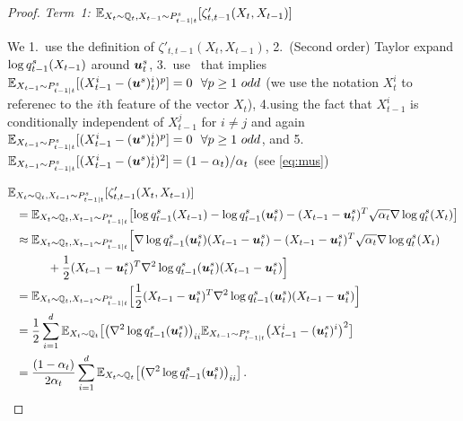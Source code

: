 \begin{proof}
\emph{Term~1:} $\allowbreak \textcolor{black}{\mathbb{E}}_{X_t\sim \mathbb{Q}_{t},X_{t-1}\sim P^s_{t-1|t}}[\zeta'_{t,t-1}(X_t,X_{t-1})]$

We  1.~use the definition of  $\zeta'_{t,t-1}(X_t,X_{t-1})$, 2.~(Second order) Taylor expand $\log q^s_{t-1}(X_{t-1})$ around $\boldsymbol{u}^s_t$, 3.~use~\citet[Lemma~7]{liang2024nonN} that implies $\textcolor{black}{\mathbb{E}}_{X_{t-1}\sim P^s_{t-1|t}}[(X_{t-1}^i-(\boldsymbol{u}^s)_t^i)^p]=0~~\forall p\ge 1~odd$ (we use the notation $X_{t}^i$ to referenec to the $i$th feature of the vector $X_{t}$), 4.using the fact that $X_{t-1}^i$ is conditionally independent of $X_{t-1}^j$ for $i\ne j$ and again $\textcolor{black}{\mathbb{E}}_{X_{t-1}\sim P^s_{t-1|t}}[(X_{t-1}^i-(\boldsymbol{u}^s)_t^i)^p]=0~~\forall p\ge 1~odd$, and 5.~$\textcolor{black}{\mathbb{E}}_{X_{t-1}\sim P^s_{t-1|t}}[(X_{t-1}^i-(\boldsymbol{u}^s)_t^i)^2]=(1-\alpha_t)/\alpha_t$ (see \eqref{eq:mus}) 

\begin{align*}
    \E&_{X_t\sim \Fd_{t},X_{t-1}\sim \Bds_{t-1|t}}[\zeta'_{t,t-1}(X_t,X_{t-1})]\\
    &=\E_{X_t\sim \Fd_{t},X_{t-1}\sim \Bds_{t-1|t}}\bigl[\log \Fdds_{t-1}(X_{t-1})-\log \Fdds_{t-1}(\us_t)-(X_{t-1}-\us_{t})^T\sqrt{\alpha_t}\nabla \log \Fdds_t(X_{t})\bigr]\\
    &\approx \E_{X_t\sim \Fd_{t},X_{t-1}\sim \Bds_{t-1|t}}\Bigl[\nabla\log \Fdds_{t-1}(\us_t)(X_{t-1}-\us_t)-(X_{t-1}-\us_{t})^T\sqrt{\alpha_t}\nabla \log \Fdds_t(X_{t})\\
    &~~~~~~~~+\frac{1}{2}(X_{t-1}-\us_t)^T \nabla^2\log \Fdds_{t-1}(\us_t)(X_{t-1}-\us_t)\Bigr] \\
    &=\E_{X_t\sim \Fd_{t},X_{t-1}\sim \Bds_{t-1|t}}\Bigl[\frac{1}{2}(X_{t-1}-\us_t)^T \nabla^2\log \Fdds_{t-1}(\us_t)(X_{t-1}-\us_t)\Bigr] \\
    &=\frac{1}{2}\sum_{i=1}^{\Dim}  \E_{X_t\sim \Fd_{t}} \bigl[\bigl(\nabla^2\log \Fdds_{t-1}(\us_t)\bigr)_{ii}\E_{X_{t-1}\sim \Bds_{t-1|t}}\bigl(X_{t-1}^i-(\us_t)^i\bigr)^2\bigr]\\
    &=\frac{(1-\alpha_t)}{2\alpha_t}\sum_{i=1}^{\Dim}  \E_{X_t\sim \Fd_{t}} \bigl[\bigl(\nabla^2\log \Fdds_{t-1}(\us_t)\bigr)_{ii}\bigr]\,.

\end{align*}
\end{proof}
